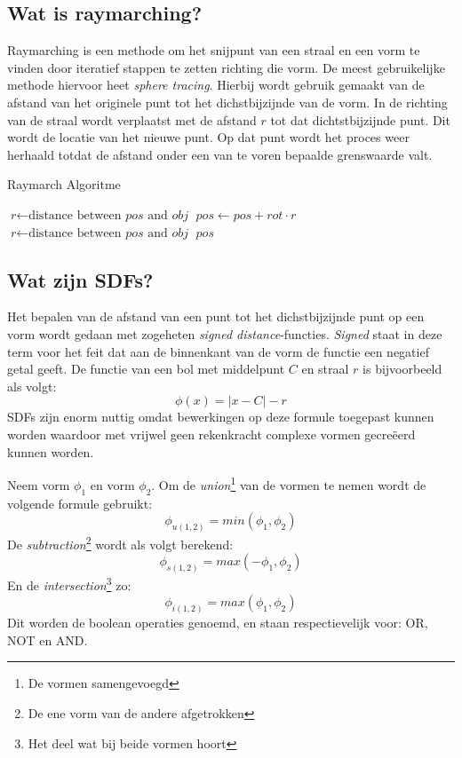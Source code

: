 \documentclass[12pt, a4paper]{article}
\begin{document}
\subsection{Wat is raymarching?}
Raymarching is een methode om het snijpunt van een straal en een vorm te vinden door iteratief stappen te zetten richting die vorm. De meest gebruikelijke methode hiervoor heet \textit{sphere tracing}.\cite{SphereTracing} Hierbij wordt gebruik gemaakt van de afstand van het originele punt tot het dichstbijzijnde van de vorm. In de richting van de straal wordt verplaatst met de afstand \(r\) tot dat dichtstbijzijnde punt. Dit wordt de locatie van het nieuwe punt. Op dat punt wordt het proces weer herhaald totdat de afstand onder een van te voren bepaalde grenswaarde valt.
\begin{algorithm}
\caption{Raymarch Algoritme}
\begin{algorithmic}[1]
\State $\textit{r} \gets \text{distance between }\textit{pos}\text{ and }\textit{obj}$
\State $\textit{pos} \gets \textit{pos} + \textit{rot} \cdot r$
\State $\textit{r} \gets \text{distance between }\textit{pos}\text{ and }\textit{obj}$
\EndWhile
\Return $\textit{pos}$
\EndProcedure
\end{algorithmic}
\end{algorithm}


\subsection{Wat zijn SDFs?}
Het bepalen van de afstand van een punt tot het dichstbijzijnde punt op een vorm wordt gedaan met zogeheten \emph{signed distance}-functies. \emph{Signed} staat in deze term voor het feit dat aan de binnenkant van de vorm de functie een negatief getal geeft. De functie van een bol met middelpunt \(C\) en straal \(r\) is bijvoorbeeld als volgt:
\[\phi (x)=\left |x-C \right | -r\]
SDFs zijn enorm nuttig omdat bewerkingen op deze formule toegepast kunnen worden waardoor met vrijwel geen rekenkracht complexe vormen gecreëerd kunnen worden. 

Neem vorm $\phi_1$ en vorm $\phi_2$. Om de \emph{union}\footnote{De vormen samengevoegd} van de vormen te nemen wordt de volgende formule gebruikt: 
\[\phi_{u(1,2)}=min(\phi_1, \phi_2)\]
De \emph{subtraction}\footnote{De ene vorm van de andere afgetrokken} wordt als volgt berekend:
\[\phi_{s(1,2)}=max(-\phi_1, \phi_2)\]
En de \emph{intersection}\footnote{Het deel wat bij beide vormen hoort} zo:
\[\phi_{i(1,2)}=max(\phi_1, \phi_2)\]
Dit worden de boolean operaties genoemd, en staan respectievelijk voor: OR, NOT en AND.
\end{document}
